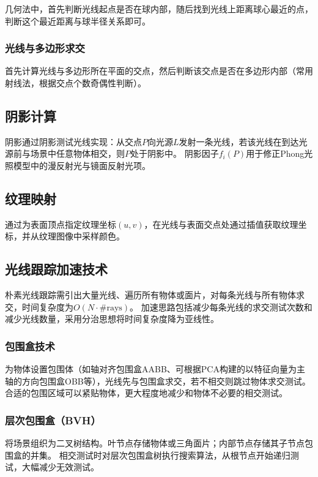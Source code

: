 \documentclass[12pt]{article}
\begin{document}
几何法中，首先判断光线起点是否在球内部，随后找到光线上距离球心最近的点，判断这个最近距离与球半径关系即可。

\subsubsection{光线与多边形求交}

首先计算光线与多边形所在平面的交点，然后判断该交点是否在多边形内部（常用射线法，根据交点个数奇偶性判断）。

\subsection{阴影计算}

阴影通过阴影测试光线实现：从交点$P$向光源$L$发射一条光线，若该光线在到达光源前与场景中任意物体相交，则$P$处于阴影中。
阴影因子$f_i(P)$用于修正Phong光照模型中的漫反射光与镜面反射光项。

\subsection{纹理映射}

通过为表面顶点指定纹理坐标$(u,v)$，在光线与表面交点处通过插值获取纹理坐标，并从纹理图像中采样颜色。

\subsection{光线跟踪加速技术}

朴素光线跟踪需引出大量光线、遍历所有物体或面片，对每条光线与所有物体求交，时间复杂度为$O(N \cdot \text{\#rays})$。
加速思路包括减少每条光线的求交测试次数和减少光线数量，采用分治思想将时间复杂度降为亚线性。

\subsubsection{包围盒技术}
为物体设置包围体（如轴对齐包围盒AABB、可根据PCA构建的以特征向量为主轴的方向包围盒OBB等），光线先与包围盒求交，若不相交则跳过物体求交测试。
合适的包围区域可以紧贴物体，更大程度地减少和物体不必要的相交测试。

\subsubsection{层次包围盒（BVH）}
将场景组织为二叉树结构。叶节点存储物体或三角面片；内部节点存储其子节点包围盒的并集。
相交测试时对层次包围盒树执行搜索算法，从根节点开始递归测试，大幅减少无效测试。
\end{document}
